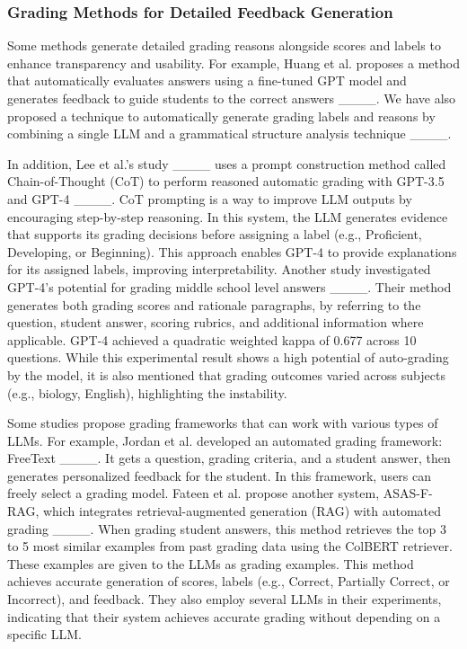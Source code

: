 \subsubsection{Grading Methods for Detailed Feedback Generation}
Some methods generate detailed grading reasons alongside scores and labels to enhance transparency and usability.
% 
For example, Huang et al. proposes a method that automatically evaluates answers using a fine-tuned GPT model and generates feedback to guide students to the correct answers ____.
We have also proposed a technique to automatically generate grading labels and reasons by combining a single LLM and a grammatical structure analysis technique ____.

In addition, Lee et al.'s study ____ uses a prompt construction method called Chain-of-Thought (CoT) to perform reasoned automatic grading with GPT-3.5 and GPT-4 ____.
CoT prompting is a way to improve LLM outputs by encouraging step-by-step reasoning.
In this system, the LLM generates evidence that supports its grading decisions before assigning a label (e.g., Proficient, Developing, or Beginning).
This approach enables GPT-4 to provide explanations for its assigned labels, improving interpretability.
% 
Another study investigated GPT-4's potential for grading middle school level answers ____.
Their method generates both grading scores and rationale paragraphs, by referring to the question, student answer, scoring rubrics, and additional information where applicable.
GPT-4 achieved a quadratic weighted kappa of 0.677 across 10 questions.
While this experimental result shows a high potential of auto-grading by the model, it is also mentioned that grading outcomes varied across subjects (e.g., biology, English), highlighting the instability.

Some studies propose grading frameworks that can work with various types of LLMs.
For example, Jordan et al. developed an automated grading framework: FreeText ____.
It gets a question, grading criteria, and a student answer, then generates personalized feedback for the student.
In this framework, users can freely select a grading model.
Fateen et al. propose another system, ASAS-F-RAG, which integrates retrieval-augmented generation (RAG) with automated grading ____.
When grading student answers, this method retrieves the top 3 to 5 most similar examples from past grading data using the ColBERT retriever.
These examples are given to the LLMs as grading examples.
This method achieves accurate generation of scores, labels (e.g., Correct, Partially Correct, or Incorrect), and feedback.
They also employ several LLMs in their experiments, indicating that their system achieves accurate grading without depending on a specific LLM.

